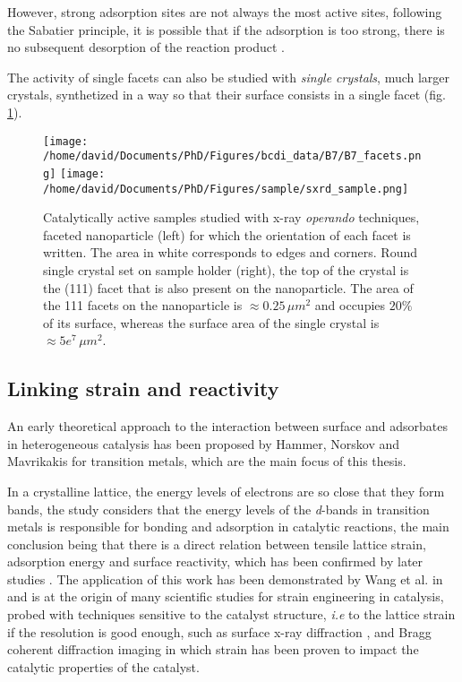 However, strong adsorption sites are not always the most active sites, following the Sabatier principle, it is possible that if the adsorption is too strong, there is no subsequent desorption of the reaction product \parencite{Nilsson2005, Jiang2009}.

The activity of single facets can also be studied with \textit{single crystals}, much larger crystals, synthetized in a way so that their surface consists in a single facet (fig. \ref{fig:Samples}).

\begin{figure}[!htb]
    \centering
    \texttt{[image: /home/david/Documents/PhD/Figures/bcdi\_data/B7/B7\_facets.png]}
    \texttt{[image: /home/david/Documents/PhD/Figures/sample/sxrd\_sample.png]}
    \caption{
        Catalytically active samples studied with x-ray \textit{operando} techniques, faceted nanoparticle (left) for which the orientation of each facet is written.
        The area in white corresponds to edges and corners.
        Round single crystal set on sample holder (right), the top of the crystal is the (111) facet that is also present on the nanoparticle.
        The area of the {111} facets on the nanoparticle is $\approx 0.25 \, \mu m^2$ and occupies $20 \%$ of its surface, whereas the surface area of the single crystal is $\approx 5e^7 \, \mu m^2$.
    }
    \label{fig:Samples}
\end{figure}

\subsection{Linking strain and reactivity}

An early theoretical approach to the interaction between surface and adsorbates in heterogeneous catalysis has been proposed by Hammer, Norskov and Mavrikakis \parencite*{Hammer1995, Mavrikakis1998, Hammer2000} for transition metals, which are the main focus of this thesis.

In a crystalline lattice, the energy levels of electrons are so close that they form bands, the study considers that the energy levels of the \textit{d}-bands in transition metals is responsible for bonding and adsorption in catalytic reactions, the main conclusion being that there is a direct relation between tensile lattice strain, adsorption energy and surface reactivity, which has been confirmed by later studies \parencite{Kitchin2004, Kibler2005, Ontaneda2015}.
The application of this work has been demonstrated by Wang et al. in \cite*{Wang2016} and is at the origin of many scientific studies for strain engineering in catalysis, probed with techniques sensitive to the catalyst structure, \textit{i.e} to the lattice strain if the resolution is good enough, such as surface x-ray diffraction \parencite{Resta2020a}, and Bragg coherent diffraction imaging \parencite{Sneed2015, Kim2019, Bjorling2019, Passos2020, Carnis2021a, Carnis2021b} in which strain has been proven to impact the catalytic properties of the catalyst.

